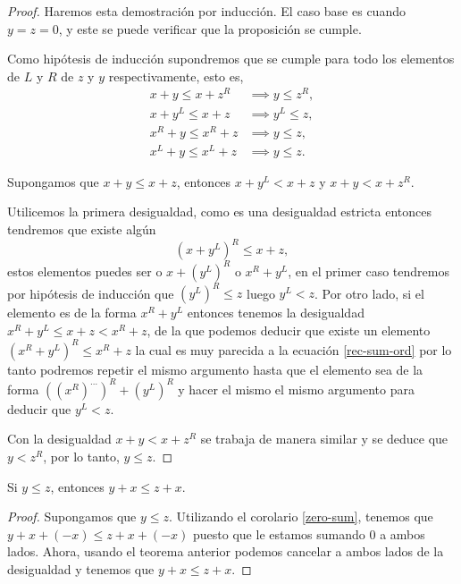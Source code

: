     \begin{proof}
        Haremos esta demostraci\'on por inducci\'on. El caso base es cuando $y=z=0$, y este se puede verificar que la proposici\'on se cumple.

        Como hip\'otesis de inducci\'on supondremos que se cumple para todo los elementos de $L$ y $R$ de $z$ y $y$ respectivamente, esto es,
        \begin{align*}
            x+y\le x+z^R & \implies y\le z^R,\\
            x+y^L\le x+z & \implies y^L\le z, \\
            x^R+y\le x^R+z & \implies y\le z,\\
            x^L+y\le x^L+z & \implies y\le z.
        \end{align*}

        Supongamos que $x+y\le x+z$, entonces $x+y^L < x+z$ y $x+y < x+z^R$. 
        
        Utilicemos la primera desigualdad, como es una desigualdad estricta entonces tendremos que existe alg\'un 
        \begin{equation}
            \label{rec-sum-ord}
            (x+y^L)^R \le x+z,
        \end{equation}
        estos elementos puedes ser o $x+(y^L)^R$ o $x^R+y^L$, en el primer caso tendremos por hip\'otesis de inducci\'on que $(y^L)^R \le z$ luego $y^L < z$. Por otro lado, si el elemento es de la forma $x^R+y^L$ entonces tenemos la desigualdad $x^R+y^L \le x+z < x^R+z$, de la que podemos deducir que existe un elemento $(x^R+y^L)^R \le x^R+z$ la cual es muy parecida a la ecuaci\'on \ref{rec-sum-ord} por lo tanto podremos repetir el mismo argumento hasta que el elemento sea de la forma $\left((x^R)^{\dots}\right)^R + (y^L)^R$ y hacer el mismo el mismo argumento para deducir que $y^L < z$.

        Con la desigualdad $x+y < x+z^R$ se trabaja de manera similar y se deduce que $y < z^R$, por lo tanto, $y\le z$.
    \end{proof}

    \begin{corollary}
        Si $y \le z$, entonces $y+x \le z+x$.
    \end{corollary}

    \begin{proof}
        Supongamos que $y\le z$. Utilizando el corolario \ref{zero-sum}, tenemos que $y+x+(-x)\le z+x+(-x)$ puesto que le estamos sumando $0$ a ambos lados. Ahora, usando el teorema anterior podemos cancelar a ambos lados de la desigualdad y tenemos que $y+x\le z+x$.
    \end{proof}

